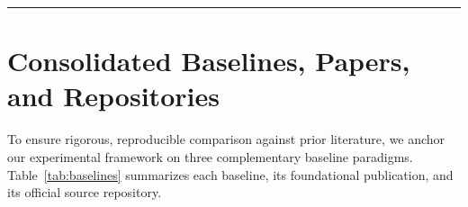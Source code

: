\documentclass[11pt,a4paper]{article}
\begin{document}
	\vspace{0.4em}
	\hrule
	\vspace{0.8em}
	
	\begin{abstract}
		Following our consultation with TA \foreignlanguage{vietnamese}{Viết Thám}, this Week 8 report formalizes the concrete execution plan for the remainder of the Mathematical Information Retrieval (MathIR) project. First, we consolidate the three core baseline paradigms—Neural (\textbf{MathBERT} by Shen et al.), Structural Tree-based (\textbf{Tangent-CFT}), and Symbolic Computer Algebra (\textbf{SymPy CAS})—alongside their foundational research papers and official open-source repositories. Second, we specify the standardized MathIR competition benchmarks (\textbf{ARQMath}, \textbf{NTCIR-12 MathIR}, and \textbf{MIRB}) together with our adversarial diagnostic suite (\texttt{test\_bottlenecks.py}) and all associated dataset links. Finally, we detail our engineering and experimental plan to construct a \textbf{Multi-Stage Neuro-Symbolic Hybrid System} designed to overcome the semantic blindness, structural inversion errors, and cross-lingual degradation observed in pure text-based neural retrieval models, while explicitly addressing calibration, parser reliability, and partial-match risks.
	\end{abstract}
	
	\section{Consolidated Baselines, Papers, and Repositories}
	To ensure rigorous, reproducible comparison against prior literature, we anchor our experimental framework on three complementary baseline paradigms. Table~\ref{tab:baselines} summarizes each baseline, its foundational publication, and its official source repository.
\end{document}
